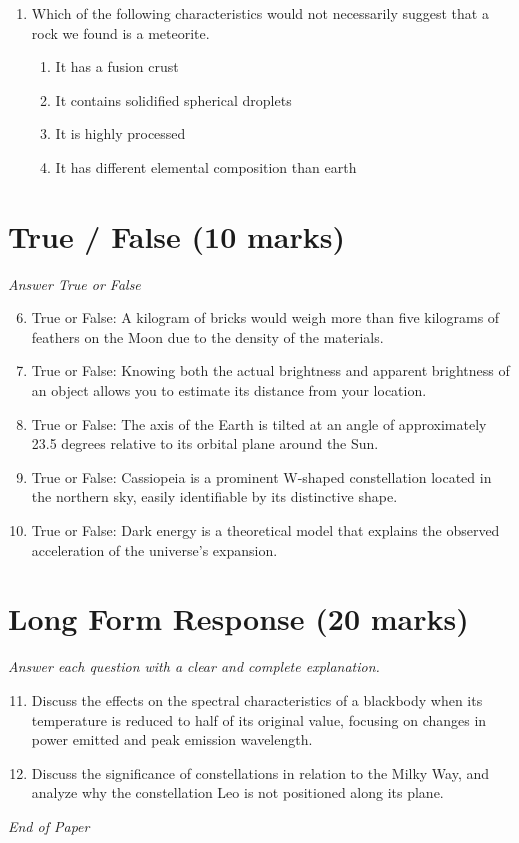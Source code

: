 \documentclass[12pt]{article}
\begin{document}
\begin{enumerate}[label=\arabic*.]
\begin{enumerate}[label=(\alph*)]
    \item Hubble Space Telescope images that resolved Pluto's disk
    \item brightness measurements made during mutual eclipses of Pluto and Charon
    \item radar observations made by the Arecibo telescope
\end{enumerate}
\item Which of the following characteristics would not necessarily suggest that a rock we found is a meteorite.
\begin{enumerate}[label=(\alph*)]
    \item It has a fusion crust
    \item It contains solidified spherical droplets
    \item It is highly processed
    \item It has different elemental composition than earth
\end{enumerate}
\end{enumerate}

\section*{True / False (10 marks)}
\textit{Answer True or False}
\begin{enumerate}[label=\arabic*.]
\setcounter{enumi}{5}
\item True or False: A kilogram of bricks would weigh more than five kilograms of feathers on the Moon due to the density of the materials.
\item True or False: Knowing both the actual brightness and apparent brightness of an object allows you to estimate its distance from your location.
\item True or False: The axis of the Earth is tilted at an angle of approximately 23.5 degrees relative to its orbital plane around the Sun.
\item True or False: Cassiopeia is a prominent W-shaped constellation located in the northern sky, easily identifiable by its distinctive shape.
\item True or False: Dark energy is a theoretical model that explains the observed acceleration of the universe's expansion.
\end{enumerate}

\section*{Long Form Response (20 marks)}
\textit{Answer each question with a clear and complete explanation.}
\begin{enumerate}[label=\arabic*.]
\setcounter{enumi}{10}
\item Discuss the effects on the spectral characteristics of a blackbody when its temperature is reduced to half of its original value, focusing on changes in power emitted and peak emission wavelength.
\item Discuss the significance of constellations in relation to the Milky Way, and analyze why the constellation Leo is not positioned along its plane.
\end{enumerate}

\vfill
\noindent\textit{End of Paper}
\end{document}
